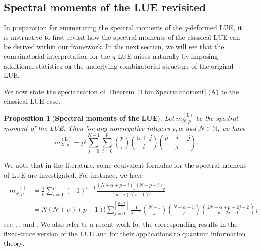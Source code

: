 \documentclass{amsart}
\newcommand{\floor}[1]{\left\lfloor#1\right\rfloor}
\theoremstyle{plain}
\newtheorem{prop}[thm]{Proposition}
\theoremstyle{remark}
\numberwithin{equation}{section}
\begin{document}
\subsection{Spectral moments of the LUE revisited} \label{Subsection_LUE moment revisit}

In preparation for enumerating the spectral moments of the $q$-deformed LUE, it is instructive to first revisit how the spectral moments of the classical LUE can be derived within our framework. 
In the next section, we will see that the combinatorial interpretation for the 
$q$-LUE arises naturally by imposing additional statistics on the 
underlying combinatorial structure of the original LUE.

We now state the specialisation of Theorem~\ref{Thm:Spectralmoment} (A) 
to the classical LUE case.
 
\begin{prop}[\textbf{Spectral moments of the LUE}]  \label{prop:spetral moment of LUE}
Let $m_{N,p}^{(\mathrm L)}$ be the spectral moment of the LUE. Then for any nonnegative integers $p,\alpha$ and $N \in \mathbb{N}$, we have 
\begin{equation}  \label{evaluation of LUE moments}
 m_{N,p}^{(\mathrm L)} = p! \sum_{j=0}^{N-1}\sum_{i=0}^{p} \binom{p}{i}  \binom{\alpha+j}{i}   \binom{p-i+j}{j}. 
\end{equation} 
\end{prop} 
 
We note that in the literature, some equivalent formulae for the spectral moment of LUE are investigated. For instance, we have 
\begin{align}
\begin{split}
\label{eqn:LUE moment 2}
    m_{N,p}^{(\mathrm{L})}&=\frac{1}{p}\sum_{i=1}^{p}(-1)^{i-1}\frac{(N+\alpha+p-i)_{p}(N+p-i)_{p}}{(p-i)!(i-1)!}
    \\
    &= N(N+\alpha)(p-1)!\sum_{j=0}^{\floor{\frac{p-1}{2}}}\frac{1}{j+1}\binom{N-1}{j}\binom{N+\alpha-1}{j}\binom{2N+\alpha+p-2j-2}{p-2j-1};
\end{split}
\end{align} 
see \cite[Theorem 2.5]{HSS92}, \cite[Proposition 9.1]{HT03}, \cite[Appendix A]{MRW15} and \cite[Proposition 3.11]{FRW17}. We also refer to a recent work \cite{FN26} for the corresponding results in the fixed-trace version of the LUE and for their applications to quantum information theory. 
 
 
\medskip 
\end{document}
